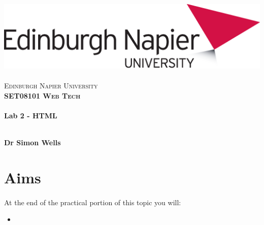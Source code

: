 \documentclass[10pt, a4paper, twosize]{article}
\begin{document}

\begin{titlepage}
\vspace*{5cm}
\begin{center}
\includegraphics[width=.5\textwidth]{images/EdNapUniLogoCMYK}~\\[1cm]

\textsc{\Large Edinburgh Napier University}\\[1.5cm]

\textsc{\LARGE \bfseries SET08101 Web Tech}\\[0.5cm]

\hrulefill \\[0.4cm]
{\huge \bfseries Lab 2 - HTML \\[0.4cm] }
\hrulefill \\[1.5cm]

\begin{minipage}{0.4\textwidth}
\begin{flushleft} \large
\textbf{Dr Simon Wells} \\
\end{flushleft}
\end{minipage}

\vfill

\end{center}
\end{titlepage}




%

\section{Aims}
\paragraph{} At the end of the practical portion of this topic you will:

\begin{itemize}
\item \end{itemize}
\end{document}
